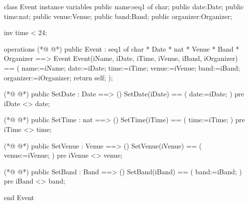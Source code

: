 \begin{vdmpp}[breaklines=true]
class Event
instance variables
 public name:seq1 of char;
  public date:Date;
  public time:nat;
  public venue:Venue;
  public band:Band;
  public organizer:Organizer;
  
  inv time < 24;

operations
(*@
\label{Event:13}
@*)
  public Event : seq1 of char * Date * nat * Venue * Band * Organizer  ==> Event
  Event(iName, iDate, iTime, iVenue, iBand, iOrganizer) == (
   name:=iName;
   date:=iDate;
   time:=iTime;
   venue:=iVenue;
   band:=iBand;
   organizer:=iOrganizer;
   return self;
  );
  
(*@
\label{SetDate:24}
@*)
  public SetDate : Date ==> ()
  SetDate(iDate) == (
   date:=iDate;
  )
  pre
   iDate <> date;
   
(*@
\label{SetTime:31}
@*)
  public SetTime : nat ==> ()
  SetTime(iTime) == (
   time:=iTime;
  )
  pre
   iTime <> time;
   
(*@
\label{SetVenue:38}
@*)
  public SetVenue : Venue ==> ()
  SetVenue(iVenue) == (
   venue:=iVenue;
  )
  pre
   iVenue <> venue;
   
(*@
\label{SetBand:45}
@*)
  public SetBand : Band ==> ()
  SetBand(iBand) == (
   band:=iBand;
  )
  pre
   iBand <> band;

end Event
\end{vdmpp}
